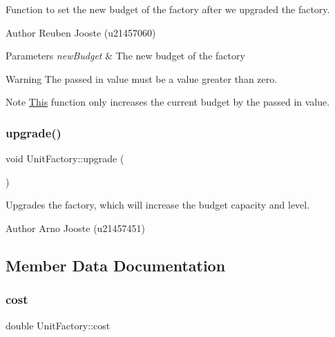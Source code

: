 Function to set the new budget of the factory after we upgraded the factory. 

\begin{DoxyAuthor}{Author}
Reuben Jooste (u21457060) 
\end{DoxyAuthor}

\begin{DoxyParams}{Parameters}
{\em new\+Budget} & The new budget of the factory \\
\hline
\end{DoxyParams}
\begin{DoxyWarning}{Warning}
The passed in value must be a value greater than zero. 
\end{DoxyWarning}
\begin{DoxyNote}{Note}
\mbox{\hyperlink{class_this}{This}} function only increases the current budget by the passed in value. 
\end{DoxyNote}
\mbox{\label{class_unit_factory_aae3d51fcddd57d4fd03582490d3a05ef}} 
\subsubsection{\texorpdfstring{upgrade()}{upgrade()}}
{\footnotesize\ttfamily void Unit\+Factory\+::upgrade (\begin{DoxyParamCaption}{ }\end{DoxyParamCaption})}



Upgrades the factory, which will increase the budget capacity and level. 

\begin{DoxyAuthor}{Author}
Arno Jooste (u21457451) 
\end{DoxyAuthor}


\subsection{Member Data Documentation}
\mbox{\label{class_unit_factory_a6fedd057efbea8ae0f0c04f28a79faac}} 
\subsubsection{\texorpdfstring{cost}{cost}}
{\footnotesize\ttfamily double Unit\+Factory\+::cost\hspace{0.3cm}{\ttfamily [protected]}}

